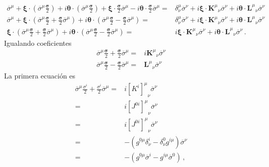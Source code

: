 \begin{align*}
 \overline{\sigma}^{\mu}+\boldsymbol{\xi}\cdot \left(\overline{\sigma}^{\mu} \frac{\boldsymbol{\sigma}}{2} \right)  +i\boldsymbol{\theta}\cdot \left(\overline{\sigma}^{\mu} \frac{\boldsymbol{\sigma}}{2} \right)+\boldsymbol{\xi}\cdot \frac{\boldsymbol{\sigma}}{2}\overline{\sigma}^{\mu} -i\boldsymbol{\theta}\cdot \frac{\boldsymbol{\sigma}}{2}\overline{\sigma}^{\mu}
 =&\delta^{\mu}_{\nu}\overline{\sigma}^\nu+i\boldsymbol{\xi}\cdot {\mathbf{K}^{\mu}}_{\nu}\overline{\sigma}^\nu+i\boldsymbol{\theta}\cdot {\mathbf{L}^{\mu}}_{\nu}\overline{\sigma}^\nu \nonumber\\
   \overline{\sigma}^{\mu}+\boldsymbol{\xi}\cdot \left(\overline{\sigma}^{\mu}\frac{\boldsymbol{\sigma}}{2}+ \frac{\boldsymbol{\sigma}}{2}\overline{\sigma}^{\mu}\right)  +i\boldsymbol{\theta}\cdot \left(\overline{\sigma}^{\mu} \frac{\boldsymbol{\sigma}}{2}-\frac{\boldsymbol{\sigma}}{2}\overline{\sigma}^{\mu} \right)  
 =&\delta^{\mu}_{\nu}\overline{\sigma}^\nu+i\boldsymbol{\xi}\cdot {\mathbf{K}^{\mu}}_{\nu}\overline{\sigma}^\nu+i\boldsymbol{\theta}\cdot {\mathbf{L}^{\mu}}_{\nu}\overline{\sigma}^\nu \nonumber\\
  \boldsymbol{\xi}\cdot \left(\overline{\sigma}^{\mu}\frac{\boldsymbol{\sigma}}{2}+ \frac{\boldsymbol{\sigma}}{2}\overline{\sigma}^{\mu}\right)  +i\boldsymbol{\theta}\cdot \left(\overline{\sigma}^{\mu} \frac{\boldsymbol{\sigma}}{2}-\frac{\boldsymbol{\sigma}}{2}\overline{\sigma}^{\mu} \right)  
 =&i\boldsymbol{\xi}\cdot {\mathbf{K}^{\mu}}_{\nu}\overline{\sigma}^\nu+i\boldsymbol{\theta}\cdot {\mathbf{L}^{\mu}}_{\nu}\overline{\sigma}^\nu\,.
\end{align*}
Igualando coeficientes
\begin{align*}
\overline{\sigma}^{\mu}\frac{\boldsymbol{\sigma}}{2}+ \frac{\boldsymbol{\sigma}}{2}\overline{\sigma}^{\mu}  =&i{\mathbf{K}^{\mu}}_{\nu}\overline{\sigma}^\nu \nonumber\\
\overline{\sigma}^{\mu} \frac{\boldsymbol{\sigma}}{2}-\frac{\boldsymbol{\sigma}}{2}\overline{\sigma}^{\mu}=&
{\mathbf{L}^{\mu}}_{\nu}\overline{\sigma}^\nu
\end{align*}
La primera ecuación es
\begin{align*}
  \overline{\sigma}^{\mu}\frac{\sigma^i}{2} +\frac{\sigma^i}{2}\overline{\sigma}^{\mu}  =&i{\left[ K^i \right]^{\mu}}_{\nu}\overline{\sigma}^\nu \nonumber\\
 =&i{\left[ J^{0i} \right]^{\mu}}_{\nu}\overline{\sigma}^\nu \nonumber\\
  =&i{\left[ J^{0i} \right]^{\mu}}_{\nu}\overline{\sigma}^\nu \nonumber\\
  =&-\left(g^{0\mu}\delta^i_{\nu} -\delta^0_{\nu}g^{i\mu}  \right)\overline{\sigma}^\nu \nonumber\\
  =&-\left(g^{0\mu}\overline{\sigma}^i -g^{i\mu} \overline{\sigma}^0  \right)\,,
\end{align*}
